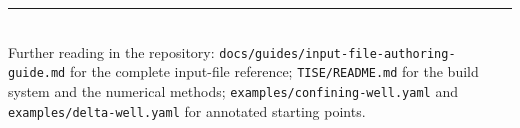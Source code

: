 \documentclass[11pt]{article}
\newcommand{\file}[1]{\texttt{#1}}
\begin{document}
\vfill
\noindent\rule{\textwidth}{0.4pt}\\
\small
Further reading in the repository:
\file{docs/guides/input-file-authoring-guide.md} for the complete input-file
reference;
\file{TISE/README.md} for the build system and the numerical methods;
\file{examples/confining-well.yaml} and \file{examples/delta-well.yaml} for
annotated starting points.
\end{document}
